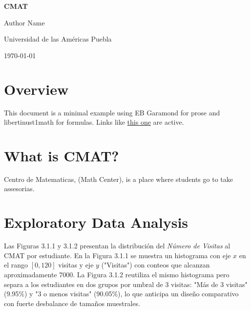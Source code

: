 \documentclass[8pt,a4paper]{article} %
\numberwithin{figure}{subsection}
\begin{document}
\begin{titlepage}
  \centering
  \vspace*{4cm}
  {\Huge\bfseries CMAT\par}
  \vspace{2cm}
  {\Large Author Name\par}
  \vspace{1cm}
  {\large Universidad de las Américas Puebla\par}
  \vfill
  {\large \today\par}
\end{titlepage}

\begin{abstract}
This document provides a template for reports in the "AI in Financial Services" course, using EB Garamond for prose and Libertinus Math for formulas. It includes a cover page, abstract, table of contents, and sample sections for math and text. Additional content demonstrates tables, code, and references.
\end{abstract}

\tableofcontents
\thispagestyle{empty}
\newpage

\section{Overview}
This document is a minimal example using EB Garamond for prose and libertinust1math for formulas.
Links like \href{https://example.com}{this one} are active.


\newpage
\section{What is CMAT?}
Centro de Matematicas, (Math Center), is a place where students go to take assesorias.



\newpage
\section{Exploratory Data Analysis}
Las Figuras 3.1.1 y 3.1.2 presentan la distribución del \textit{Número de Visitas} al CMAT por estudiante.
En la Figura 3.1.1 se muestra un histograma con eje $x$ en el rango $[0,120]$ visitas y eje $y$ ("Visitas") con conteos que alcanzan aproximadamente 7000.
La Figura 3.1.2 reutiliza el mismo histograma pero separa a los estudiantes en dos grupos por umbral de 3 visitas: "Más de 3 visitas" (9.95\%) y "3 o menos visitas" (90.05\%), lo que anticipa un diseño comparativo con fuerte desbalance de tamaños muestrales.
\end{document}
